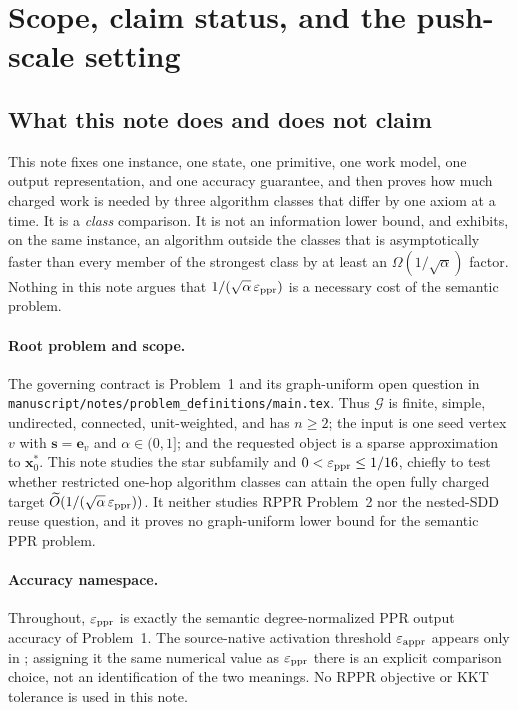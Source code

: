 \section{Scope, claim status, and the push-scale setting}
\label{sec:ladder-scope}

\subsection*{What this note does and does not claim}

This note fixes one instance, one state, one primitive, one work model, one
output representation, and one accuracy guarantee, and then proves how much
charged work is needed by three algorithm classes that differ by one axiom at
a time. It is a \emph{class} comparison. It is not an information lower
bound, and  exhibits, on the same instance, an
algorithm outside the classes that is asymptotically faster than every member
of the strongest class by at least an $\Omega(1/\sqrt\alpha)$ factor. Nothing
in this note argues that $1/(\sqrt\alpha\,\varepsilon_{\mathrm{ppr}})$ is a necessary cost of the
semantic problem.

\paragraph{Root problem and scope.}
The governing contract is Problem~1 and its graph-uniform open question in
\texttt{manuscript/notes/problem\_definitions/main.tex}. Thus
$\mathcal{G}$ is finite, simple, undirected, connected, unit-weighted, and has
$n\ge2$; the input is one seed vertex $v$ with
$\bm{s}=\bm{e}_v$ and $\alpha\in(0,1]$; and the requested object is a sparse
approximation to $\bm{x}_0^*$. This note studies the star subfamily and
$0<\varepsilon_{\mathrm{ppr}}\le1/16$, chiefly to test whether restricted one-hop algorithm
classes can attain the open fully charged target
$\widetilde{O}(1/(\sqrt\alpha\,\varepsilon_{\mathrm{ppr}}))$. It neither studies RPPR Problem~2
nor the nested-SDD reuse question, and it proves no graph-uniform lower bound
for the semantic PPR problem.

\paragraph{Accuracy namespace.}
Throughout, $\varepsilon_{\mathrm{ppr}}$ is exactly the semantic degree-normalized PPR output
accuracy of Problem~1. The source-native \APPR{} activation threshold
$\varepsilon_{\mathrm{appr}}$ appears only in ; assigning it
the same numerical value as $\varepsilon_{\mathrm{ppr}}$ there is an explicit comparison choice,
not an identification of the two meanings. No RPPR objective or KKT tolerance
is used in this note.


